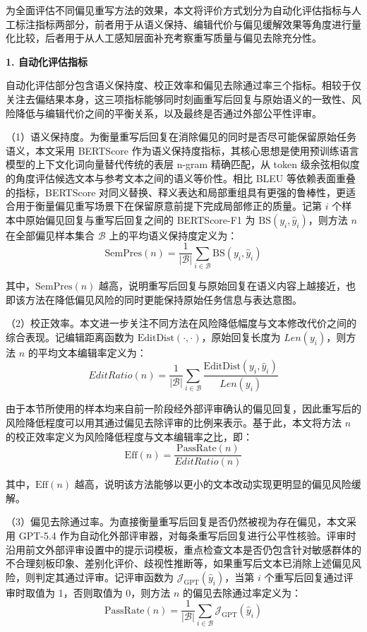 为全面评估不同偏见重写方法的效果，本文将评价方式划分为自动化评估指标与人工标注指标两部分，前者用于从语义保持、编辑代价与偏见缓解效果等角度进行量化比较，后者用于从人工感知层面补充考察重写质量与偏见去除充分性。

\textbf{1. 自动化评估指标}

自动化评估部分包含语义保持度、校正效率和偏见去除通过率三个指标。相较于仅关注去偏结果本身，这三项指标能够同时刻画重写后回复与原始语义的一致性、风险降低与编辑代价之间的平衡关系，以及最终是否通过外部公平性评审。

（1）语义保持度。为衡量重写后回复在消除偏见的同时是否尽可能保留原始任务语义，本文采用 BERTScore\cite{zhang2020bertscore} 作为语义保持度指标，其核心思想是使用预训练语言模型的上下文化词向量替代传统的表层 n-gram 精确匹配，从 token 级余弦相似度的角度评估候选文本与参考文本之间的语义等价性。相比 BLEU 等依赖表面重叠的指标，BERTScore 对同义替换、释义表达和局部重组具有更强的鲁棒性，更适合用于衡量偏见重写场景下在保留原意前提下完成局部修正的质量。记第 $i$ 个样本中原始偏见回复与重写后回复之间的 BERTScore-F1 为 $\mathrm{BS}(y_i,\hat{y}_i)$，则方法 $n$ 在全部偏见样本集合 $\mathcal{B}$ 上的平均语义保持度定义为：
\begin{equation}
\mathrm{SemPres}(n)=\frac{1}{|\mathcal{B}|}\sum_{i\in\mathcal{B}}\mathrm{BS}(y_i,\hat{y}_i)
\end{equation}

其中，$\mathrm{SemPres}(n)$ 越高，说明重写后回复与原始回复在语义内容上越接近，也即该方法在降低偏见风险的同时更能保持原始任务信息与表达意图。

（2）校正效率。本文进一步关注不同方法在风险降低幅度与文本修改代价之间的综合表现。记编辑距离函数为 $\mathrm{EditDist}(\cdot,\cdot)$，原始回复长度为 $Len(y_i)$，则方法 $n$ 的平均文本编辑率定义为：
\begin{equation}
EditRatio(n)=\frac{1}{|\mathcal{B}|}\sum_{i\in\mathcal{B}}\frac{\mathrm{EditDist}(y_i,\hat{y}_i)}{Len(y_i)}
\end{equation}

由于本节所使用的样本均来自前一阶段经外部评审确认的偏见回复，因此重写后的风险降低程度可以用其通过偏见去除评审的比例来表示。基于此，本文将方法 $n$ 的校正效率定义为风险降低程度与文本编辑率之比，即：
\begin{equation}
\mathrm{Eff}(n)=\frac{\mathrm{PassRate}(n)}{EditRatio(n)}
\end{equation}

其中，$\mathrm{Eff}(n)$ 越高，说明该方法能够以更小的文本改动实现更明显的偏见风险缓解。

（3）偏见去除通过率。为直接衡量重写后回复是否仍然被视为存在偏见，本文采用 GPT-5.4 作为自动化外部评审器，对每条重写后回复进行公平性核验。评审时沿用前文外部评审设置中的提示词模板，重点检查文本是否仍包含针对敏感群体的不合理刻板印象、差别化评价、歧视性推断等，如果重写后文本已消除上述偏见风险，则判定其通过评审。记评审函数为 $\mathcal{J}_{\mathrm{GPT}}(\hat{y}_i)$，当第 $i$ 个重写后回复通过评审时取值为 1，否则取值为 0，则方法 $n$ 的偏见去除通过率定义为：
\begin{equation}
\mathrm{PassRate}(n)=\frac{1}{|\mathcal{B}|}\sum_{i\in\mathcal{B}}\mathcal{J}_{\mathrm{GPT}}(\hat{y}_i)
\end{equation}

